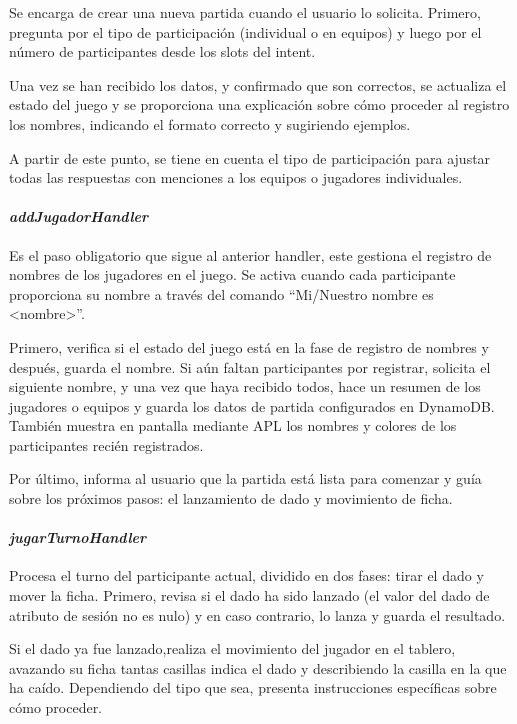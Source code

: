 Se encarga de crear una nueva partida cuando el usuario lo solicita. Primero, pregunta por el tipo de participación (individual o en equipos) y luego por el número de participantes desde los slots del intent. 

Una vez se han recibido los datos, y confirmado que son correctos, se actualiza el estado del juego y se proporciona una explicación sobre cómo proceder al registro los nombres, indicando el formato correcto y sugiriendo ejemplos. 

A partir de este punto, se tiene en cuenta el tipo de participación para ajustar todas las respuestas con menciones a los equipos o jugadores individuales. 

\paragraph{\textit{addJugadorHandler}}

Es el paso obligatorio que sigue al anterior handler, este gestiona el registro de nombres de los jugadores en el juego. Se activa cuando cada participante proporciona su nombre a través del comando \enquote{Mi/Nuestro nombre es <nombre>}. 

Primero, verifica si el estado del juego está en la fase de registro de nombres y después, guarda el nombre. Si aún faltan participantes por registrar, solicita el siguiente nombre, y una vez que haya recibido todos, hace un resumen de los jugadores o equipos y guarda los datos de partida configurados en DynamoDB. También muestra en pantalla mediante APL los nombres y colores de los participantes recién registrados.

Por último, informa al usuario que la partida está lista para comenzar y guía sobre los próximos pasos: el lanzamiento de dado y movimiento de ficha.

\paragraph{\textit{jugarTurnoHandler}}

Procesa el turno del participante actual, dividido en dos fases: tirar el dado y mover la ficha. Primero, revisa si el dado ha sido lanzado (el valor del dado de atributo de sesión no es nulo) y en caso contrario, lo lanza y guarda el resultado.

Si el dado ya fue lanzado,realiza el movimiento del jugador en el tablero, avazando su ficha tantas casillas indica el dado y describiendo la casilla en la que ha caído. Dependiendo del tipo que sea, presenta instrucciones específicas sobre cómo proceder.

